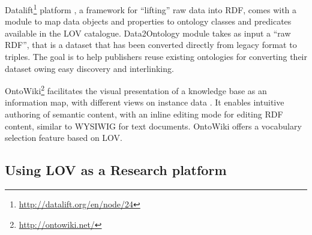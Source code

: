 \documentclass{iosart2c}
\begin{document}
Datalift\footnote{\url{http://datalift.org/en/node/24}} platform \cite{scharffe_2012}, a framework for ``lifting'' raw data into RDF, comes with a module to map data objects and properties to ontology classes and predicates available in the LOV catalogue. Data2Ontology module takes as input a ``raw RDF'', that is a dataset that has been converted directly from legacy format to triples. The goal is to help publishers reuse existing ontologies for converting their dataset owing easy discovery and interlinking. 

OntoWiki\footnote{\url{http://ontowiki.net/}} facilitates the visual presentation of a knowledge base as an information map, with different views on instance data \cite{auer2006ontowiki}. It enables intuitive authoring of semantic content, with an inline editing mode for editing RDF content, similar to WYSIWIG for text documents. OntoWiki offers a vocabulary selection feature based on LOV.


\subsection{Using LOV as a Research platform}
\end{document}
